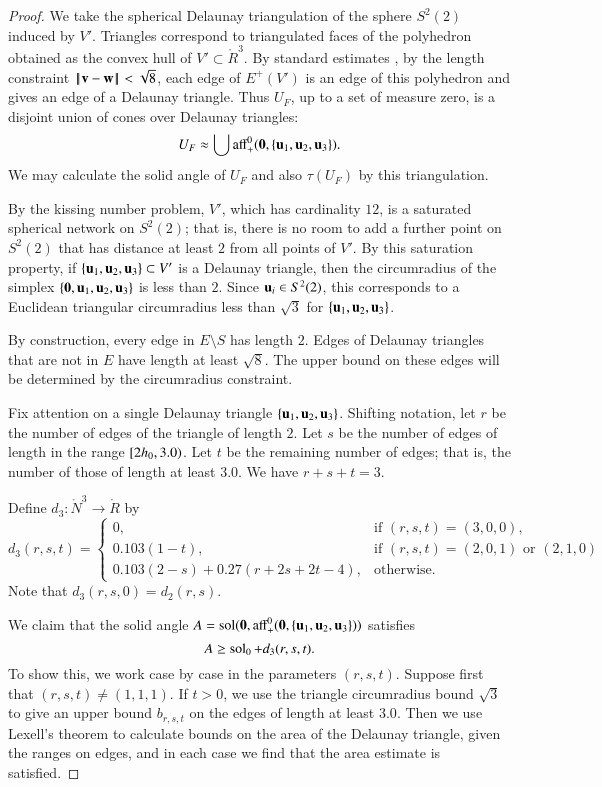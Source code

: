 \documentclass{llncs}
\def\op#1{{\hbox{#1}}}
\begin{document}
\begin{proof}  
  We take the spherical Delaunay triangulation of the sphere $S^2(2)$ induced by $V'$.  
Triangles correspond to triangulated faces of the polyhedron obtained as 
the convex hull of $V'\subset\ring{R}^3$.  By standard estimates 
\cite{DSP}, by the length constraint $\norm{\v}{\w}<\sqrt8$, 
each edge of $E^+(V')$ is an edge of this polyhedron and 
gives an edge of a Delaunay triangle.  Thus $U_F$, up to a set of measure zero, 
is a disjoint union of cones over Delaunay triangles:
\[
U_F \approx \bigcup \op{aff}_+^0(\orz,\{\u_1,\u_2,\u_3\}).
\]
We may calculate the solid angle of $U_F$ and also $\tau(U_F)$ by this triangulation.

By the kissing number problem, $V'$, which has cardinality $12$, is a saturated spherical network on $S^2(2)$;
that is, there is no room to add a further point on $S^2(2)$ that has distance at least $2$ from all points
of $V'$.  By this saturation property, if $\{{\mathbf u}_1,{\mathbf u}_2,{\mathbf u}_3\}\subset V'$ is a Delaunay triangle, then
the circumradius of the simplex $\{{\mathbf 0},{\mathbf u}_1,{\mathbf u}_2,{\mathbf u}_3\}$ is less than $2$.  Since ${\mathbf u}_i\in S^2(2)$, this
corresponds to a Euclidean triangular circumradius less than $\sqrt3$ for $\{{\mathbf u}_1,{\mathbf u}_2,{\mathbf u}_3\}$.

By construction,  every edge in $E\setminus S$ has length $2$.
Edges of Delaunay triangles that are not in $E$ have length at least $\sqrt8$.  The upper bound
on these edges will be determined by the circumradius constraint.

Fix attention on a single Delaunay triangle $\{{\mathbf u}_1,{\mathbf u}_2,{\mathbf u}_3\}$. Shifting notation,
let $r$ be the number of edges of the triangle of length $2$.  Let $s$ be the number of edges
of length in the range $[ 2h_0,3.0)$.  Let $t$ be the remaining number of edges; 
that is, the number of those of length at least $3.0$.  We have $r+s+t=3$.

Define $d_3:\ring{N}^3\to\ring{R}$ by
\[
d_3(r,s,t) = 
\begin{cases}
0, & \text{if } (r,s,t)=(3,0,0),\\
0.103 (1 - t), &\text{if } (r,s,t)=(2,0,1) \text{ or } (2,1,0)\\
0.103 (2 - s) + 0.27 (r+2 s+2 t-4),&\text{otherwise. }
\end{cases}
\]
Note that $d_3(r,s,0)=d_2(r,s)$.

We claim that the solid angle $A=\op{sol}(\orz,\op{aff}_+^0(\orz,\{\u_1,\u_2,\u_3\}))$ satisfies
\begin{equation}\label{eqn:d3}
A\ge \operatorname{sol}_0 + d_3(r,s,t).
\end{equation}
To show this, we work case by case in the parameters $(r,s,t)$.
Suppose first that $(r,s,t)\ne (1,1,1)$.
If $t>0$, we use the triangle circumradius bound $\sqrt3$ 
to give an upper bound $b_{r,s,t}$ on the edges of length at least $3.0$.
Then we use Lexell's theorem to calculate bounds on the area of the Delaunay triangle,
given the ranges on edges, and in each case we find that the area estimate is satisfied.


\end{proof}
\end{document}
